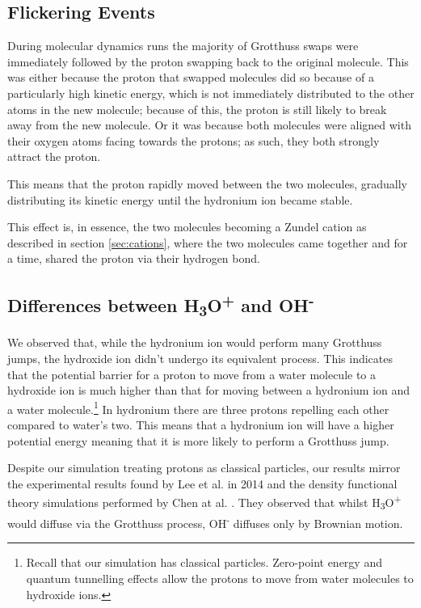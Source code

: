 \documentclass{article}
\begin{document}
\begin{multicols}{2}
\subsection{Flickering Events}
During molecular dynamics runs the majority of Grotthuss swaps were immediately followed by the proton swapping back to the original molecule. This was either because the proton that swapped molecules did so because of a particularly high kinetic energy, which is not immediately distributed to the other atoms in the new molecule; because of this, the proton is still likely to break away from the new molecule. Or it was because both molecules were aligned with their oxygen atoms facing towards the protons; as such, they both strongly attract the proton.

This means that the proton rapidly moved between the two molecules, gradually distributing its kinetic energy until the hydronium ion became stable.

This effect is, in essence, the two molecules becoming a Zundel cation \cite{Zundel2006} as described in section \ref{sec:cations}, where the two molecules came together and for a time, shared the proton via their hydrogen bond.

\subsection{Differences between H\textsubscript{3}O\textsuperscript{+} and OH\textsuperscript{-}}
We observed that, while the hydronium ion would perform many Grotthuss jumps, the hydroxide ion didn't undergo its equivalent process. This indicates that the potential barrier for a proton to move from a water molecule to a hydroxide ion is much higher than that for moving between a hydronium ion and a water molecule.\footnote{Recall that our simulation has classical particles. Zero-point energy and quantum tunnelling effects allow the protons to move from water molecules to hydroxide ions.} In hydronium there are three protons repelling each other compared to water's two. This means that a hydronium ion will have a higher potential energy meaning that it is more likely to perform a Grotthuss jump.

Despite our simulation treating protons as classical particles, our results mirror the experimental results found by Lee et al. in 2014 \cite{Lee2014} and the density functional theory simulations performed by Chen at al. \cite{chen2018hydroxide}. They observed that whilst H\textsubscript{3}O\textsuperscript{+} would diffuse via the Grotthuss process,  OH\textsuperscript{-} diffuses only by Brownian motion.


\end{multicols}
\end{document}
